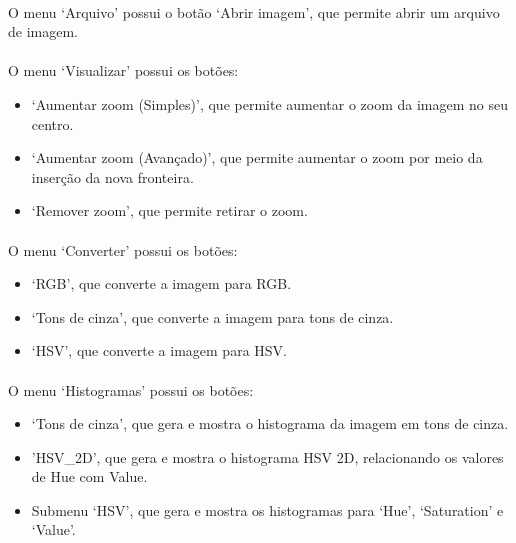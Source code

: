 \documentclass[12pt]{article}
\begin{document}
\paragraph{}O menu ‘Arquivo’ possui o botão ‘Abrir imagem’, que permite abrir um arquivo de imagem.

\paragraph{}O menu ‘Visualizar’ possui os botões:

\begin{itemize}
    \item ‘Aumentar zoom (Simples)’, que permite aumentar o zoom da imagem no seu centro.

    \item ‘Aumentar zoom (Avançado)’, que permite aumentar o zoom por meio da inserção da nova fronteira.

    \item ‘Remover zoom’, que permite retirar o zoom.
\end{itemize}

\paragraph{}O menu ‘Converter’ possui os botões:

\begin{itemize}
    \item ‘RGB’, que converte a imagem para RGB.
    
    \item ‘Tons de cinza’, que converte a imagem para tons de cinza.
    
    \item ‘HSV’, que converte a imagem para HSV.
\end{itemize}

\paragraph{}O menu ‘Histogramas’ possui os botões:

\begin{itemize}
    \item ‘Tons de cinza’, que gera e mostra o histograma da imagem em tons de cinza.

    \item 'HSV\_2D', que gera e mostra o histograma HSV 2D, relacionando os valores de Hue com Value.

    \item Submenu ‘HSV’, que gera e mostra os histogramas para ‘Hue’, ‘Saturation’ e ‘Value’.
\end{itemize}
\end{document}

